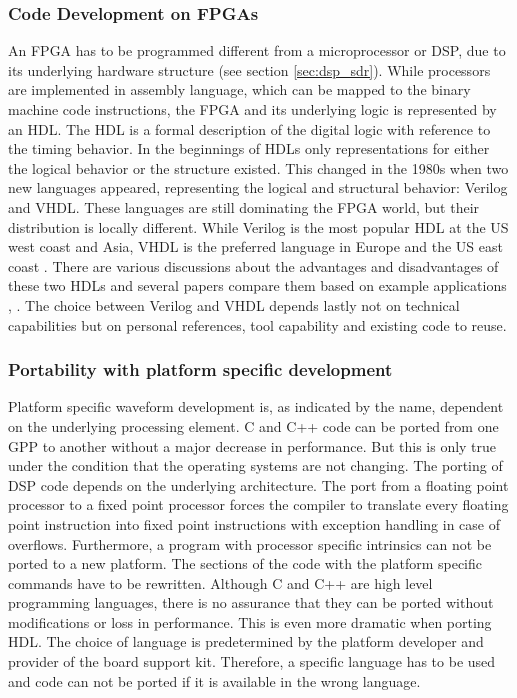 \subsubsection{Code Development on \acp{FPGA}}
An \ac{FPGA} has to be programmed different from a microprocessor or \ac{DSP}, due to its underlying hardware structure (see section \ref{sec:dsp_sdr}). While processors are implemented in assembly language, which can be mapped to the binary machine code instructions, the \ac{FPGA} and its underlying logic is represented by an \ac{HDL}. The \ac{HDL} is a formal description of the digital logic with reference to the timing behavior. In the beginnings of \acp{HDL} only representations for either the logical behavior or the structure existed. This changed in the 1980s when two new languages appeared, representing the logical and structural behavior: Verilog and VHDL. These languages are still dominating the FPGA world, but their distribution is locally different. While Verilog is the most popular \ac{HDL} at the US west coast and Asia, VHDL is the preferred language in Europe and the US east coast \cite{baese}. There are various discussions about the advantages and disadvantages of these two \acp{HDL} and several papers compare them based on example applications \cite{verilog_vs_vhdl01}, \cite{verilog_vs_vhdl_02}. The choice between Verilog and VHDL depends lastly not on technical capabilities but on personal references, tool capability and existing code to reuse. 

\subsubsection{Portability with platform specific development}
Platform specific waveform development is, as indicated by the name, dependent on the underlying processing element. C and C++ code can be ported from one GPP to another without a major decrease in performance. But this is only true under the condition that the operating systems are not changing. The porting of DSP code depends on the underlying architecture. The port from a floating point processor to a fixed point processor forces the compiler to translate every floating point instruction into fixed point instructions with exception handling in case of overflows. Furthermore, a program with processor specific intrinsics can not be ported to a new platform. The sections of the code with the platform specific commands have to be rewritten. Although C and C++ are high level programming languages, there is no assurance that they can be ported without modifications or loss in performance. This is even more dramatic when porting \ac{HDL}. The choice of language is predetermined by the platform developer and provider of the board support kit. Therefore, a specific language has to be used and code can not be ported if it is available in the wrong language.

